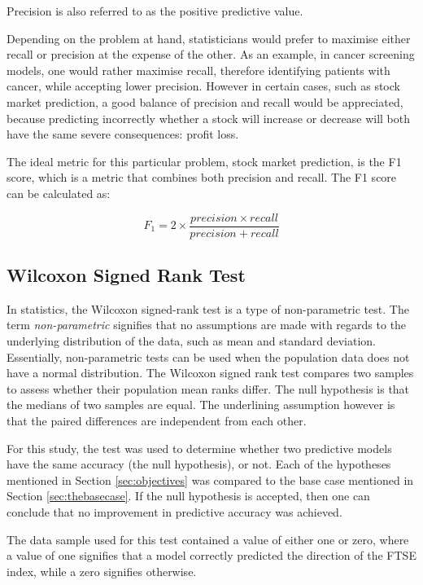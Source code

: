 \documentclass{UoYCSproject}
\begin{document}
Precision is also referred to as the positive predictive value.

Depending on the problem at hand, statisticians would prefer to maximise either recall or precision at the expense of the other. As an example, in cancer screening models, one would rather maximise recall, therefore identifying patients with cancer, while accepting lower precision. However in certain cases, such as stock market prediction, a good balance of precision and recall would be appreciated, because predicting incorrectly whether a stock will increase or decrease will both have the same severe consequences: profit loss.

The ideal metric for this particular problem, stock market prediction, is the F1 score, which is a metric that combines both precision and recall. The F1 score can be calculated as:

\begin{equation}
\label{eq:f1}
F_1=2 \times \frac{precision \times recall}{precision + recall}
\end{equation}

\subsection{Wilcoxon Signed Rank Test} 
\label{sec:wilcoxon}
In statistics, the Wilcoxon signed-rank test is a type of non-parametric test. The term \textit{non-parametric} signifies that no assumptions are made with regards to the underlying distribution of the data, such as mean and standard deviation. Essentially, non-parametric tests can be used when the population data does not have a normal distribution. The Wilcoxon signed rank test compares two samples to assess whether their population mean ranks differ. The null hypothesis is that the medians of two samples are equal. The underlining assumption however is that the paired differences are independent from each other.

For this study, the test was used to determine whether two predictive models have the same accuracy (the null hypothesis), or not. Each of the hypotheses mentioned in Section \ref{sec:objectives} was compared to the base case mentioned in Section \ref{sec:thebasecase}. If the null hypothesis is accepted, then one can conclude that no improvement in predictive accuracy was achieved. 

The data sample used for this test contained a value of either one or zero, where a value of one signifies that a model correctly predicted the direction of the FTSE index, while a zero signifies otherwise.
\end{document}
